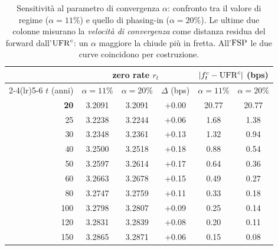 \begin{table}[H]\centering\small
\caption{Sensitivit\`a al parametro di convergenza $\alpha$: confronto tra il valore di regime ($\alpha=11\%$) e quello di phasing-in ($\alpha=20\%$). Le ultime due colonne misurano la \emph{velocit\`a di convergenza} come distanza residua del forward dall'$\mathrm{UFR}^c$: un $\alpha$ maggiore la chiude pi\`u in fretta. All'$\mathrm{FSP}$ le due curve coincidono per costruzione.}
\label{tab:alpha-sens}\renewcommand{\arraystretch}{1.15}
\begin{tabular}{rccccc}
\toprule
& \multicolumn{3}{c}{zero rate $r_t$} & \multicolumn{2}{c}{$|f^c_t-\mathrm{UFR}^c|$ (bps)}\\
\cmidrule(lr){2-4}\cmidrule(lr){5-6}
$t$ (anni) & $\alpha=11\%$ & $\alpha=20\%$ & $\Delta$ (bps) & $\alpha=11\%$ & $\alpha=20\%$\\
\midrule
\rowcolor{rowtint}\textbf{20} & 3.2091 & 3.2091 & +0.00 & 20.77 & 20.77\\
25 & 3.2238 & 3.2244 & +0.06 & 1.68 & 1.38\\
\rowcolor{rowtint}30 & 3.2348 & 3.2361 & +0.13 & 1.32 & 0.94\\
40 & 3.2500 & 3.2518 & +0.18 & 0.88 & 0.54\\
\rowcolor{rowtint}50 & 3.2597 & 3.2614 & +0.17 & 0.64 & 0.36\\
60 & 3.2663 & 3.2678 & +0.15 & 0.49 & 0.27\\
\rowcolor{rowtint}80 & 3.2747 & 3.2759 & +0.11 & 0.33 & 0.18\\
100 & 3.2798 & 3.2807 & +0.09 & 0.25 & 0.14\\
\rowcolor{rowtint}120 & 3.2831 & 3.2839 & +0.08 & 0.20 & 0.11\\
150 & 3.2865 & 3.2871 & +0.06 & 0.15 & 0.08\\
\bottomrule
\end{tabular}
\end{table}
